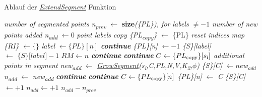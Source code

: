 \begin{algorithm}
	\caption{Ablauf der \textit{\hyperref[alg: extend_segments]{ExtendSegment}} Funktion}
	\label{alg: extend_segments}
	\begin{algorithmic}[1]
		\State \textit{number of segmented points n\textsubscript{prev}} $\gets$ \textbf{size}\textit{(\{PL\}), for labels $\neq -1$ }
		\State \textit{number of new points added n\textsubscript{add}} $\gets 0$
		\State \textit{point labels copy \{PL\textsubscript{copy}\}} $\gets$ \{PL\}
		\State \textit{reset indices map \{RI\}} $\gets \{\}$
		\State \textit{label} $\gets \{PL\}[n]$
		\State \textit{\textbf{continue}}
		\EndIf
		\State \textit{\{PL\}[n]} $\gets -1$
		\State \textit{\{S\}[label]} $\gets\textit{ \{S\}[label]} - 1$
		\State $RM \gets n$
		\EndFor
		\EndFor
		\State \textit{\textbf{continue}}
		\EndIf
		\State \textit{\textbf{continue}}
		\EndIf
		\State $C \gets \{PL\textsubscript{copy}\}[s\textsubscript{i}]$
		\State \textit{additional points in segment new\textsubscript{add}} $\gets$ \textit{\hyperref[alg:grow_segment]{GrowSegment}(s\textsubscript{i},C,PL,N,V,K\textsubscript{2},$\phi$)}
		\State \textit{\{S\}[C]} $\gets new_{add}$
		\State \textit{n\textsubscript{add}} $\gets$ \textit{new\textsubscript{add}}
		\EndFor
		\State \textit{\textbf{continue}}
		\EndIf
		\State \textit{\textbf{continue}}
		\EndIf
		\State $C \gets \{PL\textsubscript{copy}\}[n]$
		\State \textit{\{PL\}[n]} $\gets$ \textit{C}
		\State \textit{\{S\}[C]} $\gets + 1$
		\State $n_{add} \gets + 1$
		\EndFor
		\EndFor
		\State \Return $n_{add} - n_{prev}$
		\EndFunction
		
	\end{algorithmic}
\end{algorithm}

